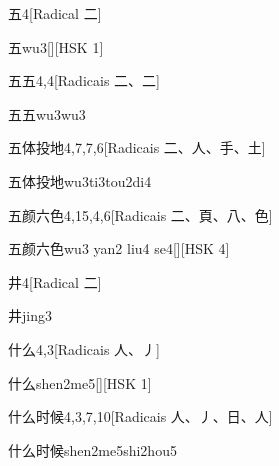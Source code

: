 \begin{entry}{五}{4}[Radical ⼆]
  \begin{phonetics}{五}{wu3}[][HSK 1]
  \end{phonetics}
\end{entry}

\begin{entry}{五五}{4,4}[Radicais ⼆、⼆]
  \begin{phonetics}{五五}{wu3wu3}
  \end{phonetics}
\end{entry}

\begin{entry}{五体投地}{4,7,7,6}[Radicais ⼆、⼈、⼿、⼟]
  \begin{phonetics}{五体投地}{wu3ti3tou2di4}
  \end{phonetics}
\end{entry}

\begin{entry}{五颜六色}{4,15,4,6}[Radicais ⼆、⾴、⼋、⾊]
  \begin{phonetics}{五颜六色}{wu3 yan2 liu4 se4}[][HSK 4]
  \end{phonetics}
\end{entry}

\begin{entry}{井}{4}[Radical ⼆]
  \begin{phonetics}{井}{jing3}
  \end{phonetics}
\end{entry}

\begin{entry}{什么}{4,3}[Radicais ⼈、⼃]
  \begin{phonetics}{什么}{shen2me5}[][HSK 1]
  \end{phonetics}
\end{entry}

\begin{entry}{什么时候}{4,3,7,10}[Radicais ⼈、⼃、⽇、⼈]
  \begin{phonetics}{什么时候}{shen2me5shi2hou5}
  \end{phonetics}
\end{entry}

